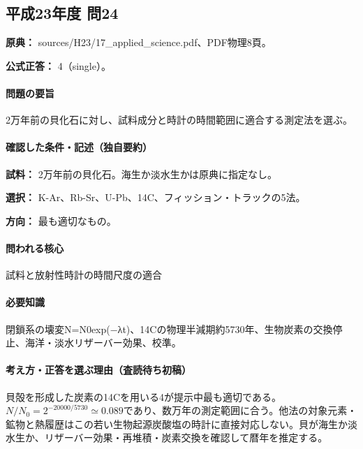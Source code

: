 \subsection{平成23年度 問24}
\label{q:h23-reg-applied-24}

\noindent\textbf{原典：} sources/H23/17\_applied\_science.pdf、PDF物理8頁。

\textbf{公式正答：} 4（single）。

\paragraph{問題の要旨} 2万年前の貝化石に対し、試料成分と時計の時間範囲に適合する測定法を選ぶ。

\paragraph{確認した条件・記述（独自要約）}\mbox{}\par

\noindent\textbf{試料：} 2万年前の貝化石。海生か淡水生かは原典に指定なし。\par

\noindent\textbf{選択：} K-Ar、Rb-Sr、U-Pb、14C、フィッション・トラックの5法。\par

\noindent\textbf{方向：} 最も適切なもの。\par

\paragraph{問われる核心} 試料と放射性時計の時間尺度の適合

\paragraph{必要知識} 閉鎖系の壊変N=\allowbreak{}N0exp(−λt)、14Cの物理半減期約5730年、生物炭素の交換停止、海洋・淡水リザーバー効果、校準。

\paragraph{考え方・正答を選ぶ理由（査読待ち初稿）} 貝殻を形成した炭素の14Cを用いる4が提示中最も適切である。\(N/N_0=2^{-20000/5730}\simeq0.089\)であり、数万年の測定範囲に合う。他法の対象元素・鉱物と熱履歴はこの若い生物起源炭酸塩の時計に直接対応しない。貝が海生か淡水生か、リザーバー効果・再堆積・炭素交換を確認して暦年を推定する。

